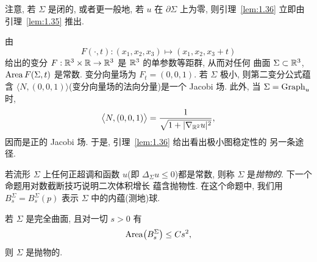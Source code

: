 注意, 若 $\Sigma$ 是闭的, 或者更一般地, 若 $u$ 在 $\partial\Sigma$ 上为零,
则引理~\ref{lem:1.36} 立即由引理~\ref{lem:1.35} 推出.

由
\begin{equation}
F(\cdot,t):(x_1,x_2,x_3)\mapsto(x_1,x_2,x_3+t)
\label{eq:1.179}
\end{equation}
给出的变分 $F:\mathbb{R}^3\times\mathbb{R}\to\mathbb{R}^3$ 是 $\mathbb{R}^3$ 的单参数等距群, 从而对任何
曲面 $\Sigma\subset\mathbb{R}^3$, $\operatorname{Area} F(\Sigma,t)$ 是常数. 变分向量场为
$F_t=(0,0,1)$. 若 $\Sigma$ 极小, 则第二变分公式蕴含
$\langle N,(0,0,1)\rangle$(变分向量场的法向分量)是一个 Jacobi 场. 此外,
当 $\Sigma=\operatorname{Graph}_u$ 时,
\begin{equation}
\bigl\langle N,(0,0,1)\bigr\rangle
 =\frac{1}{\sqrt{1+|\nabla_{\mathbb{R}^2}u|^{2}}},
\label{eq:1.180}
\end{equation}
因而是正的 Jacobi 场. 于是, 引理~\ref{lem:1.36} 给出看出极小图稳定性的
另一条途径.

若流形 $\Sigma$ 上任何正超调和函数 $u$(即 $\Delta_{\Sigma}u\leq0$)都是常数,
则称 $\Sigma$ 是\emph{抛物的}. 下一个命题用对数截断技巧说明二次体积增长
蕴含抛物性. 在这个命题中, 我们用 $B_s^{\Sigma}=B_s^{\Sigma}(p)$ 表示
$\Sigma$ 中的内蕴(测地)球.

\begin{proposition}
\label{prop:1.37}
若 $\Sigma$ 是完全曲面, 且对一切 $s>0$ 有
\begin{equation}
\operatorname{Area}\bigl(B_s^{\Sigma}\bigr)\leq Cs^{2},
\label{eq:1.181}
\end{equation}
则 $\Sigma$ 是抛物的.
\end{proposition}

